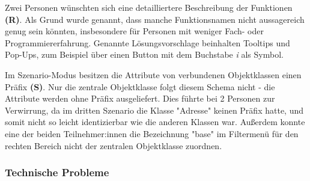 Zwei Personen wünschten sich eine detailliertere Beschreibung der Funktionen \textbf{(R)}. Als Grund wurde genannt, dass manche Funktionsnamen nicht aussagereich genug sein könnten, insbesondere für Personen mit weniger Fach- oder Programmiererfahrung. Genannte Lösungsvorschlage beinhalten Tooltips und Pop-Ups, zum Beispiel über einen Button mit dem Buchstabe \textit{i} als Symbol.

Im Szenario-Modus besitzen die Attribute von verbundenen Objektklassen einen Präfix \textbf{(S)}. Nur die zentrale Objektklasse folgt diesem Schema nicht - die Attribute werden ohne Präfix ausgeliefert. Dies führte bei 2 Personen zur Verwirrung, da im dritten Szenario die Klasse "Adresse" keinen Präfix hatte, und somit nicht so leicht identizierbar wie die anderen Klassen war. Außerdem konnte eine der beiden Teilnehmer:innen die Bezeichnung "base" im Filtermenü für den rechten Bereich nicht der zentralen Objektklasse zuordnen.

\subsubsection{Technische Probleme}

